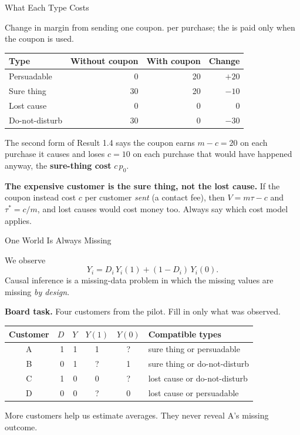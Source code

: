 \documentclass[aspectratio=169, 11pt, handout]{beamer}
\begin{document}
\begin{frame}{What Each Type Costs}

Change in margin from sending one coupon.  per purchase; the  is paid only when the coupon is used.

\begin{center}
\begin{tabular}{lrrr}
\toprule
\textbf{Type} & \textbf{Without coupon} & \textbf{With coupon} & \textbf{Change} \\
\midrule
Persuadable & 0 & 20 & \textcolor{sbgreen}{$+20$} \\
Sure thing & 30 & 20 & \textcolor{warnred}{$-10$} \\
Lost cause & 0 & 0 & $0$ \\
Do-not-disturb & 30 & 0 & \textcolor{warnred}{$-30$} \\
\bottomrule
\end{tabular}
\end{center}

The second form of Result 1.4 says the coupon earns $m - c = 20$ on each purchase it causes and loses $c = 10$ on each purchase that would have happened anyway, the \textbf{sure-thing cost} $c\,p_0$.

\medskip

\textbf{The expensive customer is the sure thing, not the lost cause.} If the coupon instead cost $c$ per customer \emph{sent} (a contact fee), then $V = m\tau - c$ and $\tau^\ast = c/m$, and lost causes would cost money too. Always say which cost model applies.
\end{frame}

\begin{frame}{One World Is Always Missing}

We observe
\[
Y_i = D_i\, Y_i(1) + (1 - D_i)\, Y_i(0) .
\]
Causal inference is a missing-data problem in which the missing values are missing \emph{by design}.

\medskip

\textbf{Board task.} Four customers from the pilot. Fill in only what was observed.

\begin{center}
\small
\begin{tabular}{crrccl}
\toprule
\textbf{Customer} & $D$ & $Y$ & $Y(1)$ & $Y(0)$ & \textbf{Compatible types} \\
\midrule
A & 1 & 1 & 1 & ? & sure thing or persuadable \\
B & 0 & 1 & ? & 1 & sure thing or do-not-disturb \\
C & 1 & 0 & 0 & ? & lost cause or do-not-disturb \\
D & 0 & 0 & ? & 0 & lost cause or persuadable \\
\bottomrule
\end{tabular}
\end{center}

More customers help us estimate averages. They never reveal A's missing outcome.
\end{frame}
\end{document}
